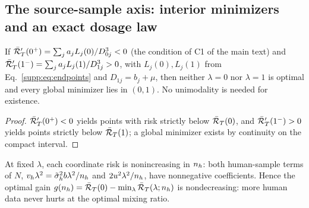 \subsection{The source-sample axis: interior minimizers and an exact dosage law}

\begin{corollary}\label{supp:cor:interior}
If $\bar{\mathcal{R}}_T'(0^+) = \sum_j a_j L_j(0)/D_{0j}^3 < 0$ (the condition of C1 of the main text) and $\bar{\mathcal{R}}_T'(1^-) = \sum_j a_j L_j(1)/D_{1j}^3 > 0$, with $L_j(0), L_j(1)$ from Eq.~\eqref{supp:eq:endpoints} and $D_{1j} = b_j + \mu$, then neither $\lambda = 0$ nor $\lambda = 1$ is optimal and every global minimizer lies in $(0,1)$.
No unimodality is needed for existence.
\end{corollary}

\begin{proof}
$\bar{\mathcal{R}}_T'(0^+) < 0$ yields points with risk strictly below $\bar{\mathcal{R}}_T(0)$, and $\bar{\mathcal{R}}_T'(1^-) > 0$ yields points strictly below $\bar{\mathcal{R}}_T(1)$; a global minimizer exists by continuity on the compact interval.
\end{proof}

\begin{lemma}\label{supp:lem:monoval}
At fixed $\lambda$, each coordinate risk is nonincreasing in $n_h$: both human-sample terms of $N$, $v_h\lambda^2 = \tilde\sigma_h^2 b \lambda^2/n_h$ and $2u^2\lambda^2/n_h$, have nonnegative coefficients.
Hence the optimal gain $g(n_h) = \bar{\mathcal{R}}_T(0) - \min_{\lambda}\bar{\mathcal{R}}_T(\lambda; n_h)$ is nondecreasing: more human data never hurts at the optimal mixing ratio.
\end{lemma}


